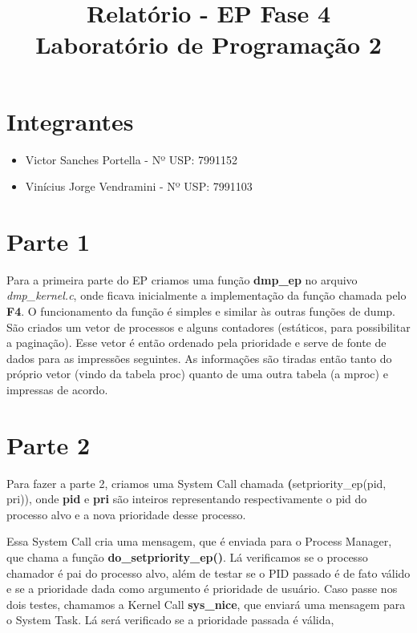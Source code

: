 \documentclass[11pt]{article}
\title{Relatório - EP Fase 4 \\ Laboratório de Programação 2}
\begin{document}
\maketitle

\section{Integrantes}

\begin{itemize}

\item Victor Sanches Portella - Nº USP: 7991152

\item Vinícius Jorge Vendramini - Nº USP: 7991103



\end{itemize}

\section{Parte 1}

Para a primeira parte do EP criamos uma função \textbf{dmp\_ep} no arquivo \textit{dmp\_kernel.c}, onde ficava inicialmente a implementação da função chamada pelo \textbf{F4}. O funcionamento da função é simples e similar às outras funções de dump. São criados um vetor de processos e alguns contadores (estáticos, para possibilitar a paginação). Esse vetor é então ordenado pela prioridade e serve de fonte de dados para as impressões seguintes. As informações são tiradas então tanto do próprio vetor (vindo da tabela proc) quanto de uma outra tabela (a mproc) e impressas de acordo.


\section{Parte 2}

Para fazer a parte 2, criamos uma System Call chamada \textbf(setpriority\_ep(pid, 
pri)), onde \textbf{pid} e \textbf{pri} são inteiros representando respectivamente
o pid do processo alvo e a nova prioridade desse processo.

Essa System Call cria uma mensagem, que é enviada para o Process Manager, que chama
a função \textbf{do\_setpriority\_ep()}. Lá verificamos se o processo chamador é 
pai do processo alvo, além de testar se o PID passado é de fato válido e se a prioridade dada como argumento é prioridade de usuário. Caso passe nos dois testes, chamamos a Kernel Call \textbf{sys\_nice}, que enviará uma mensagem para o System Task. Lá será verificado se a prioridade passada é válida,
\end{document}
